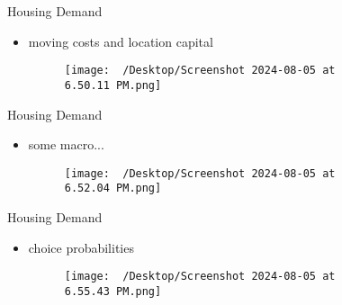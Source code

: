 \begin{frame}{Housing Demand}
    \begin{itemize}
         \item moving costs and location capital
         \begin{figure}
            \centering
            \caption{}
            \label{fig:photo}
        \end{figure}
        \begin{figure}
            \centering
            \texttt{[image: ~/Desktop/Screenshot 2024-08-05 at 6.50.11 PM.png]}
            \caption{}
            \label{fig:photo}
        \end{figure}
    \end{itemize}
 \end{frame}

\begin{frame}{Housing Demand}
    \begin{itemize}
         \item some macro...
            \begin{figure}
                \centering
                \texttt{[image: ~/Desktop/Screenshot 2024-08-05 at 6.52.04 PM.png]}
                \caption{}
                \label{fig:photo}
            \end{figure}
    \end{itemize}
 \end{frame}

\begin{frame}{Housing Demand}
    \begin{itemize}
         \item choice probabilities
            \begin{figure}
                \centering
                \texttt{[image: ~/Desktop/Screenshot 2024-08-05 at 6.55.43 PM.png]}
                \caption{}
                \label{fig:photo}
            \end{figure}
    \end{itemize}
 \end{frame}

